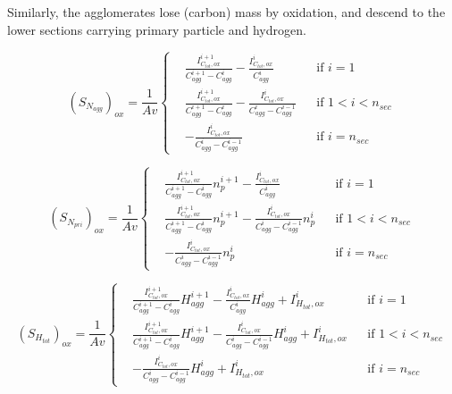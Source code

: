 Similarly, the agglomerates lose (carbon) mass by oxidation, and descend to the lower sections carrying primary particle and hydrogen.

\begin{equation}
	\left(S_{N_{agg}}\right)_{ox}=
	\frac{1}{Av}
	\left\{
	\begin{aligned}
		&\frac{I^{i+1}_{C_{tot},ox}}{C^{i+1}_{agg}-C^{i}_{agg}}
		-
		\frac{I^{i}_{C_{tot},ox}}{C^{i}_{agg}}
		&&
		\text{if } i = 1
		\\
		&\frac{I^{i+1}_{C_{tot},ox}}{C^{i+1}_{agg}-C^{i}_{agg}}
		-
		\frac{I^{i}_{C_{tot},ox}}{C^{i}_{agg}-C^{i-1}_{agg}}
		&&
		\text{if } 1 < i < n_{sec}
		\\
		&
		-
		\frac{I^{i}_{C_{tot},ox}}{C^{i}_{agg}-C^{i-1}_{agg}}
		&&\text{if } i=n_{sec}
	\end{aligned}
	\right.
	\label{eqn:S_Nagg_oxsect}
\end{equation}

\begin{equation}
	\left(S_{N_{pri}}\right)_{ox}=
	\frac{1}{Av}
	\left\{
	\begin{aligned}
		&\frac{I^{i+1}_{C_{tot},ox}}{C^{i+1}_{agg}-C^{i}_{agg}}n^{i+1}_p
		-
		\frac{I^{i}_{C_{tot},ox}}{C^{i}_{agg}}
		&&
		\text{if } i = 1
		\\
		&\frac{I^{i+1}_{C_{tot},ox}}{C^{i+1}_{agg}-C^{i}_{agg}}n^{i+1}_p
		-
		\frac{I^{i}_{C_{tot},ox}}{C^{i}_{agg}-C^{i-1}_{agg}}n^{i}_p
		&&
		\text{if } 1 < i < n_{sec}
		\\
		&
		-
		\frac{I^{i}_{C_{tot},ox}}{C^{i}_{agg}-C^{i-1}_{agg}}n^{i}_p
		&&\text{if } i=n_{sec}
	\end{aligned}
	\right.
	\label{eqn:S_Npri_oxsect}
\end{equation}

\begin{equation}
	\left(S_{H_{tot}}\right)_{ox}=
	\frac{1}{Av}
	\left\{
	\begin{aligned}
		&\frac{I^{i+1}_{C_{tot},ox}}{C^{i+1}_{agg}-C^{i}_{agg}}H^{i+1}_{agg}
		-
		\frac{I^{i}_{C_{tot},ox}}{C^{i}_{agg}}H^{i}_{agg}
		+ I^{i}_{H_{tot}, ox}
		&&
		\text{if } i = 1
		\\
		&\frac{I^{i+1}_{C_{tot},ox}}{C^{i+1}_{agg}-C^{i}_{agg}}H^{i+1}_{agg}
		-
		\frac{I^{i}_{C_{tot},ox}}{C^{i}_{agg}-C^{i-1}_{agg}}H^{i}_{agg}
		+ I^{i}_{H_{tot}, ox}
		&&
		\text{if } 1 < i < n_{sec}
		\\
		&
		-
		\frac{I^{i}_{C_{tot},ox}}{C^{i}_{agg}-C^{i-1}_{agg}}H^{i}_{agg}
		+ I^{i}_{H_{tot}, ox}
		&&\text{if } i=n_{sec}
	\end{aligned}
	\right.
	\label{eqn:S_Htot_oxsect}
\end{equation}

